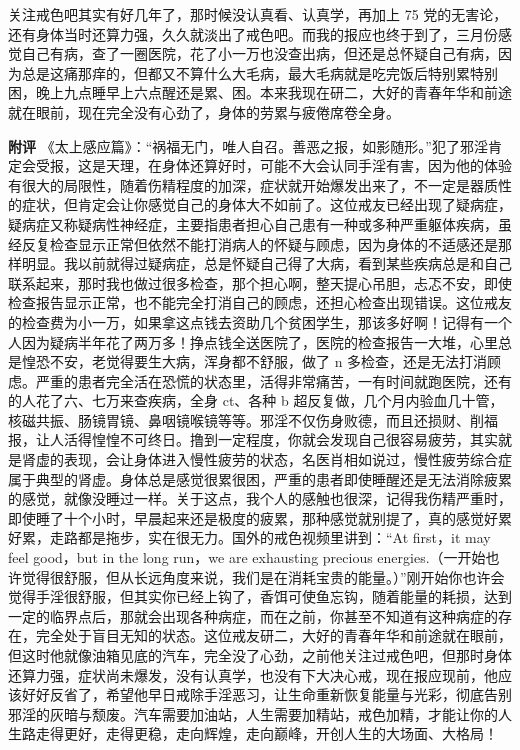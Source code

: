 \begin{case}
    关注戒色吧其实有好几年了，那时候没认真看、认真学，再加上 75 党的无害论，还有身体当时还算力强，久久就淡出了戒色吧。而我的报应也终于到了，三月份感觉自己有病，查了一圈医院，花了小一万也没查出病，但还是总怀疑自己有病，因为总是这痛那痒的，但都又不算什么大毛病，最大毛病就是吃完饭后特别累特别困，晚上九点睡早上六点醒还是累、困。本来我现在研二，大好的青春年华和前途就在眼前，现在完全没有心劲了，身体的劳累与疲倦席卷全身。

    \textbf{附评} 《太上感应篇》：“祸福无门，唯人自召。善恶之报，如影随形。”犯了邪淫肯定会受报，这是天理，在身体还算好时，可能不大会认同手淫有害，因为他的体验有很大的局限性，随着伤精程度的加深，症状就开始爆发出来了，不一定是器质性的症状，但肯定会让你感觉自己的身体大不如前了。这位戒友已经出现了疑病症，疑病症又称疑病性神经症，主要指患者担心自己患有一种或多种严重躯体疾病，虽经反复检查显示正常但依然不能打消病人的怀疑与顾虑，因为身体的不适感还是那样明显。我以前就得过疑病症，总是怀疑自己得了大病，看到某些疾病总是和自己联系起来，那时我也做过很多检查，那个担心啊，整天提心吊胆，忐忑不安，即使检查报告显示正常，也不能完全打消自己的顾虑，还担心检查出现错误。这位戒友的检查费为小一万，如果拿这点钱去资助几个贫困学生，那该多好啊！记得有一个人因为疑病半年花了两万多！挣点钱全送医院了，医院的检查报告一大堆，心里总是惶恐不安，老觉得要生大病，浑身都不舒服，做了 n 多检查，还是无法打消顾虑。严重的患者完全活在恐慌的状态里，活得非常痛苦，一有时间就跑医院，还有的人花了六、七万来查疾病，全身 ct、各种 b 超反复做，几个月内验血几十管，核磁共振、肠镜胃镜、鼻咽镜喉镜等等。邪淫不仅伤身败德，而且还损财、削福报，让人活得惶惶不可终日。撸到一定程度，你就会发现自己很容易疲劳，其实就是肾虚的表现，会让身体进入慢性疲劳的状态，名医肖相如说过，慢性疲劳综合症属于典型的肾虚。身体总是感觉很累很困，严重的患者即使睡醒还是无法消除疲累的感觉，就像没睡过一样。关于这点，我个人的感触也很深，记得我伤精严重时，即使睡了十个小时，早晨起来还是极度的疲累，那种感觉就别提了，真的感觉好累好累，走路都是拖步，实在很无力。国外的戒色视频里讲到：“At first，it may feel good，but in the long run，we are exhausting precious energies.（一开始也许觉得很舒服，但从长远角度来说，我们是在消耗宝贵的能量。）”刚开始你也许会觉得手淫很舒服，但其实你已经上钩了，香饵可使鱼忘钩，随着能量的耗损，达到一定的临界点后，那就会出现各种病症，而在之前，你甚至不知道有这种病症的存在，完全处于盲目无知的状态。这位戒友研二，大好的青春年华和前途就在眼前，但这时他就像油箱见底的汽车，完全没了心劲，之前他关注过戒色吧，但那时身体还算力强，症状尚未爆发，没有认真学，也没有下大决心戒，现在报应现前，他应该好好反省了，希望他早日戒除手淫恶习，让生命重新恢复能量与光彩，彻底告别邪淫的灰暗与颓废。汽车需要加油站，人生需要加精站，戒色加精，才能让你的人生路走得更好，走得更稳，走向辉煌，走向巅峰，开创人生的大场面、大格局！
\end{case}

